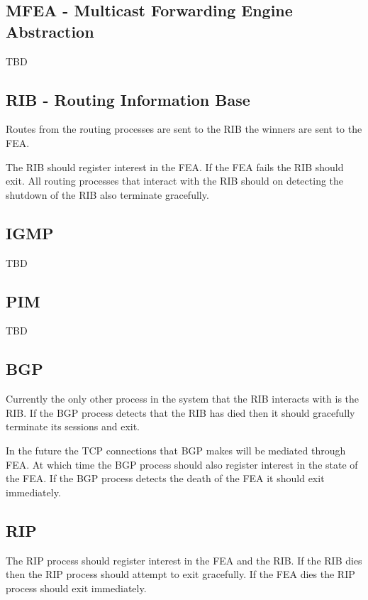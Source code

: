 \documentclass[11pt]{article}
\begin{document}
\subsection{MFEA - Multicast Forwarding Engine Abstraction}

TBD

\subsection{RIB - Routing Information Base}

Routes from the routing processes are sent to the RIB the winners are
sent to the FEA.

The RIB should register interest in the FEA. If the FEA fails the RIB
should exit. All routing processes that interact with the RIB should
on detecting the shutdown of the RIB also terminate gracefully.

\subsection{IGMP}

TBD

\subsection{PIM}

TBD

\subsection{BGP}

Currently the only other process in the system that the RIB interacts
with is the RIB. If the BGP process detects that the RIB has died then
it should gracefully terminate its sessions and exit.

In the future the TCP connections that BGP makes will be mediated
through FEA. At which time the BGP process should also register
interest in the state of the FEA. If the BGP process detects the death
of the FEA it should exit immediately.

\subsection{RIP}

The RIP process should register interest in the FEA and the RIB. If
the RIB dies then the RIP process should attempt to exit gracefully.
If the FEA dies the RIP process should exit immediately.
\end{document}
